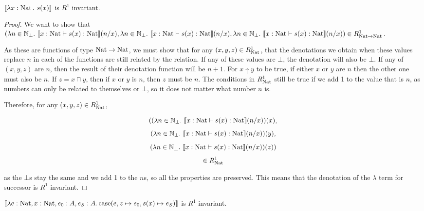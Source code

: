 \vspace{0.5cm}

\begin{lem}
$\llbracket \lambda x : \operatorname{Nat} . \ s(x) \rrbracket$ is $R^1$ invariant.
\end{lem}

\vspace{0.25cm}

\begin{proof} 
We want to show 
 that  $(\lambda n \in \mathbb{N}_{\bot}. \ \llbracket x : \operatorname{Nat} \vdash s(x) : \operatorname{Nat} \rrbracket (n/x),\lambda n \in \mathbb{N}_{\bot}. \ \llbracket x : \operatorname{Nat} \vdash s(x) : \operatorname{Nat} \rrbracket (n/x), \lambda n \in \mathbb{N}_{\bot}. \ \llbracket x : \operatorname{Nat} \vdash s(x) : \operatorname{Nat} \rrbracket (n/x)) \in R_{\operatorname{Nat} \to \operatorname{Nat}}^1$. 
 
As these are functions of type $\operatorname{Nat} \to \operatorname{Nat}$, we must show that for any $(x,y,z) \in R_{\operatorname{Nat}}^1$, that the denotations we obtain when these values replace $n$ in each of the functions are still related by the relation. If any of these values are $\bot$, the denotation will also be $\bot$. If any of $(x,y,z)$ are $n$, then the result of their denotation function will be $n+1$. For $x \uparrow y$ to be true, if either $x$ or $y$ are $n$ then the other one must also be $n$. If $z = x \sqcap y$, then if $x$ or $y$ is $n$, then $z$ must be $n$. The conditions in $R_{\operatorname{Nat}}^1$ still be true if we add 1 to the value that is $n$, as  numbers can only be related to themselves or $\bot$, so it does not matter what number $n$ is.

Therefore, for any $(x,y,z) \in R_{\operatorname{Nat}}^1$,

 \[((\lambda n \in \mathbb{N}_{\bot}. \ \llbracket x : \nat \vdash s(x) : \nat \rrbracket (n/x)) (x),\]
 \[(\lambda n \in \mathbb{N}_{\bot}. \ \llbracket x : \nat \vdash s(x) : \nat \rrbracket (n/x)) (y), \]
 \[(\lambda n \in \mathbb{N}_{\bot}. \ \llbracket x : \nat \vdash s(x) : \nat \rrbracket (n/x))(z))\]
 \[ \in R_{\operatorname{Nat}}^1\]
 
as the $\bot$s stay the same and we add 1 to the $n$s, so all the properties are preserved. This means that the denotation of the $\lambda$ term for successor is $R^1$ invariant.
\end{proof}

\vspace{0.5cm}

\begin{lem}
$\llbracket \lambda e : \operatorname{Nat}, x : \operatorname{Nat}, e_0 : A, e_S : A. \operatorname{case} (e, z \mapsto e_0, s(x) \mapsto e_S) \rrbracket$ is $R^1$ invariant.
\end{lem}

